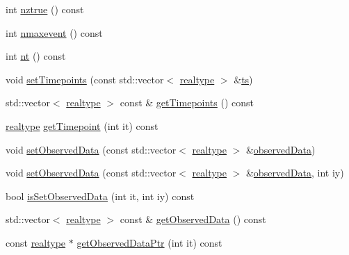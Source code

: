 \begin{DoxyCompactItemize}
\item 
int \mbox{\hyperlink{classamici_1_1_exp_data_a9e9b6341842d8860b0114faa4e0c97ee}{nztrue}} () const
\item 
int \mbox{\hyperlink{classamici_1_1_exp_data_ae6996d31ed94180a4b1d79412eb5ce31}{nmaxevent}} () const
\item 
int \mbox{\hyperlink{classamici_1_1_exp_data_a4c23d300cbe15b0afb1ee3731d47cc93}{nt}} () const
\item 
void \mbox{\hyperlink{classamici_1_1_exp_data_a058fb6c96339b5116b1af937bc77c2e4}{set\+Timepoints}} (const std\+::vector$<$ \mbox{\hyperlink{namespaceamici_a1bdce28051d6a53868f7ccbf5f2c14a3}{realtype}} $>$ \&\mbox{\hyperlink{classamici_1_1_exp_data_aa7014a80e7b102f85a10e3b9a480e8e5}{ts}})
\item 
std\+::vector$<$ \mbox{\hyperlink{namespaceamici_a1bdce28051d6a53868f7ccbf5f2c14a3}{realtype}} $>$ const  \& \mbox{\hyperlink{classamici_1_1_exp_data_a50ea5198d117f8f4ad1e34bb279975c8}{get\+Timepoints}} () const
\item 
\mbox{\hyperlink{namespaceamici_a1bdce28051d6a53868f7ccbf5f2c14a3}{realtype}} \mbox{\hyperlink{classamici_1_1_exp_data_abee92d90cb7fe75fa39fb98c2ab0fd0a}{get\+Timepoint}} (int it) const
\item 
void \mbox{\hyperlink{classamici_1_1_exp_data_a85ca23791c279fe94e5d9f8e528ca63e}{set\+Observed\+Data}} (const std\+::vector$<$ \mbox{\hyperlink{namespaceamici_a1bdce28051d6a53868f7ccbf5f2c14a3}{realtype}} $>$ \&\mbox{\hyperlink{classamici_1_1_exp_data_a6acedf749a3c5e4c4dcbc822f58a565d}{observed\+Data}})
\item 
void \mbox{\hyperlink{classamici_1_1_exp_data_a814827d61da6c675276758c856faf794}{set\+Observed\+Data}} (const std\+::vector$<$ \mbox{\hyperlink{namespaceamici_a1bdce28051d6a53868f7ccbf5f2c14a3}{realtype}} $>$ \&\mbox{\hyperlink{classamici_1_1_exp_data_a6acedf749a3c5e4c4dcbc822f58a565d}{observed\+Data}}, int iy)
\item 
bool \mbox{\hyperlink{classamici_1_1_exp_data_aedcda756b6356d6e147f2f4eb7658500}{is\+Set\+Observed\+Data}} (int it, int iy) const
\item 
std\+::vector$<$ \mbox{\hyperlink{namespaceamici_a1bdce28051d6a53868f7ccbf5f2c14a3}{realtype}} $>$ const  \& \mbox{\hyperlink{classamici_1_1_exp_data_a509b3b8f38e8529dd59c1415dc6b839c}{get\+Observed\+Data}} () const
\item 
const \mbox{\hyperlink{namespaceamici_a1bdce28051d6a53868f7ccbf5f2c14a3}{realtype}} $\ast$ \mbox{\hyperlink{classamici_1_1_exp_data_a8839910b831f8c55976d880df081fb3e}{get\+Observed\+Data\+Ptr}} (int it) const

\end{DoxyCompactItemize}
